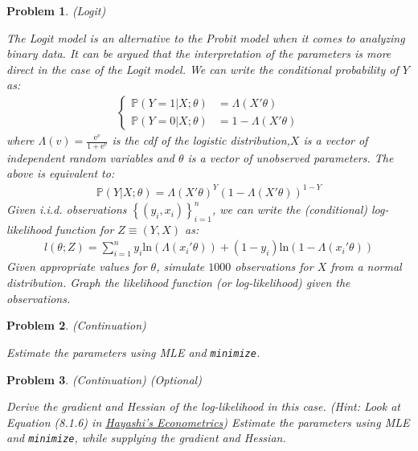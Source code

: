\documentclass[12pt, a4paper]{article}
\newcommand{\e}[1]{\text{e}^{#1}}
\newcommand{\Set}[1]{\left\{#1\right\}}
\renewcommand{\ln}[1]{\text{ln}\left(#1\right)}
\newtheorem{problem}{Problem}
\begin{document}
\begin{problem}
(Logit)

The Logit model is an alternative to the Probit model when it comes to analyzing binary data.
It can be argued that the interpretation of the parameters is more direct in the case of the Logit model.
We can write the conditional probability of \(Y\) as:
\begin{align*}
  \begin{cases}
    \mathbb{P}(Y=1\vert X; \theta) &= \Lambda(X'\theta)\\
    \mathbb{P}(Y=0\vert X; \theta) &= 1 - \Lambda(X'\theta)
  \end{cases}
\end{align*}
where \(\Lambda(v)=\frac{\e{v}}{1+\e{v}}\) is the cdf of the logistic distribution,\(X\) is a vector of independent random variables and \(\theta\) is a vector of unobserved parameters.
The above is equivalent to:
\begin{align*}
\mathbb{P}(Y\vert X;\theta)={\Lambda(X'\theta)}^Y(1-\Lambda(X'\theta))^{1-Y}
\end{align*}
Given i.i.d. observations \(\Set{(y_i, x_i)}_{i=1}^n\), we can write the (conditional) log-likelihood function for \(Z\equiv(Y,X)\) as:
\begin{align*}
l(\theta; Z)=\sum_{i=1}^n y_i\ln{\Lambda(x_i'\theta)} + (1-y_i)\ln{1-\Lambda(x_i'\theta)}
\end{align*}
Given appropriate values for \(\theta\), simulate \(1000\) observations for \(X\) from a normal distribution.
Graph the likelihood function (or log-likelihood) given the observations.
\end{problem}

\begin{problem}
(Continuation)

Estimate the parameters using MLE and \texttt{minimize}.
\end{problem}

\begin{problem}
(Continuation) (Optional)

Derive the gradient and Hessian of the log-likelihood in this case. (Hint: Look at Equation (8.1.6) in \href{https://press.princeton.edu/titles/6946.html}{Hayashi's Econometrics})
Estimate the parameters using MLE and \texttt{minimize}, while supplying the gradient and Hessian.
\end{problem}
\end{document}
